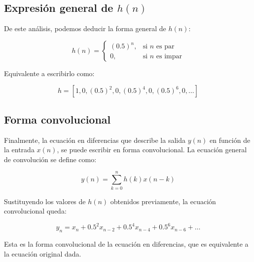 \documentclass[10pt]{article}
\theoremstyle{definition}
\theoremstyle{remark}
\theoremstyle{definition}
\numberwithin{equation}{prob}
\begin{document}
\subsection*{Expresión general de \( h(n) \)}

De este análisis, podemos deducir la forma general de \( h(n) \):

\[
h(n) = 
\begin{cases} 
(0.5)^n, & \text{si } n \text{ es par} \\
0, & \text{si } n \text{ es impar}
\end{cases}
\]

Equivalente a escribirlo como:

\[
h = [1, 0, (0.5)^2, 0, (0.5)^4, 0, (0.5)^6, 0, \dots]
\]

\subsection*{Forma convolucional}

Finalmente, la ecuación en diferencias que describe la salida \( y(n) \) en función de la entrada \( x(n) \), se puede escribir en forma convolucional. La ecuación general de convolución se define como:

\[
y(n) = \sum_{k=0}^{n} h(k)x(n-k)
\]

Sustituyendo los valores de \( h(n) \) obtenidos previamente, la ecuación convolucional queda:

\[
y_n = x_n + 0.5^2 x_{n-2} + 0.5^4 x_{n-4} + 0.5^6 x_{n-6} + \dots
\]

Esta es la forma convolucional de la ecuación en diferencias, que es equivalente a la ecuación original dada.
	
\end{document}
